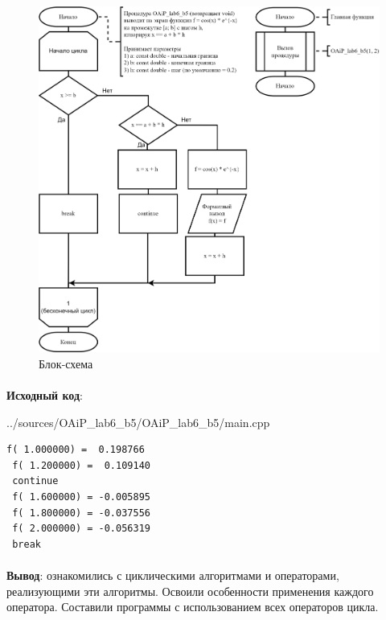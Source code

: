 \documentclass[12pt, a4paper, simple]{eskdtext}
\begin{document}
\begin{figure}[!h]
    \centering
    \includegraphics[]
    {../sources/flowcharts/OAiP_lab6_b5.png}
    \caption{Блок-схема}
    \label{fig:b5}
\end{figure}

\paragraph{} \textbf{Исходный код}: 


{../sources/OAiP_lab6_b5/OAiP_lab6_b5/main.cpp}

\begin{lstlisting}[name=Вывод в консоль]
 f( 1.000000) =  0.198766
 f( 1.200000) =  0.109140
 continue
 f( 1.600000) = -0.005895
 f( 1.800000) = -0.037556
 f( 2.000000) = -0.056319
 break
\end{lstlisting}

\paragraph{} \textbf{Вывод}:
ознакомились с циклическими алгоритмами и операторами, реализующими эти алгоритмы.
Освоили особенности применения каждого оператора.
Составили программы с использованием всех операторов цикла.
\end{document}
